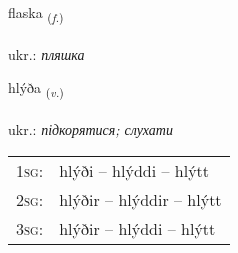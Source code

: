 \documentclass[frontgrid, backgrid]{flacards}\usepackage[]{graphicx}\usepackage[]{xcolor}
\begin{document}
\renewcommand{\flhead}{\vskip5pt \fboxsep=0pt {\small\bfseries\footnotesize Nafnorð | іменник}}
\renewcommand{\fcfoot}{\vskip5pt \fboxsep=0pt \hspace{2pt}{\small\bfseries\footnotesize 3K}}

\renewcommand{\blhead}{\vskip5pt {\small\bfseries\footnotesize Nafnorð | іменник }}
\renewcommand{\bcfoot}{\vskip5pt \hspace{2pt}{\small\bfseries\footnotesize 3K}}


{flaska \small{\textsubscript{(\textit{f.})}} \\[1ex] %
\textphonetic{[flaska]} \\
ukr.: \emph{пляшка} \\  [2ex]
\renewcommand*{\arraystretch}{0.8}
}

\renewcommand{\flhead}{\vskip5pt \fboxsep=0pt {\small\bfseries\footnotesize Sagnorð | дієслово}}
\renewcommand{\fcfoot}{\vskip5pt \fboxsep=0pt \hspace{2pt}{\small\bfseries\footnotesize 3K}}

\renewcommand{\blhead}{\vskip5pt {\small\bfseries\footnotesize Sagnorð | дієслово }}
\renewcommand{\bcfoot}{\vskip5pt \hspace{2pt}{\small\bfseries\footnotesize 3K}}


{hlýða \small{\textsubscript{(\textit{v.})}} \\[1ex] %
\textphonetic{[l̥iːða]} \\
ukr.: \emph{підкорятися; слухати} \\  [2ex]
\renewcommand*{\arraystretch}{0.8}
\begin{tabular}{p{1cm}l}
\textsc{1sg}: & hlýði -- hlýddi -- hlýtt \\ 
\textsc{2sg}: & hlýðir -- hlýddir -- hlýtt \\ 
\textsc{3sg}: & hlýðir -- hlýddi -- hlýtt \\ 
\end{tabular}
}
\end{document}
